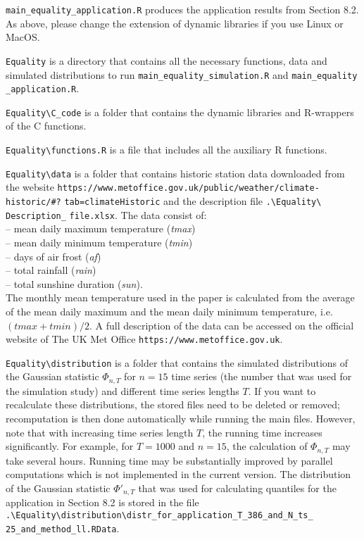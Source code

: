 \documentclass[a4paper,12pt]{article}
\begin{document}
\verb|main_equality_application.R| \hspace{1pt} produces the application results from Section 8.2. As above, please change the extension of dynamic libraries if you use Linux or MacOS.

\verb|Equality| \hspace{1pt} is a directory that contains all the necessary functions, data and simulated distributions to run \verb|main_equality_simulation.R| and \verb|main_equality| \linebreak \verb|_application.R|.

\verb|Equality\C_code| \hspace{1pt} is a folder that contains the dynamic libraries and R-wrappers of the C functions.

\verb|Equality\functions.R| \hspace{1pt} is a file that includes all the auxiliary R functions.

\verb|Equality\data| \hspace{1pt} is a folder that contains historic station data downloaded from the website
{\verb|https://www.metoffice.gov.uk/public/weather/climate-historic/#?| \linebreak \verb|tab=climateHistoric|
and the description file \verb|.\Equality\| \verb|Description_| \verb|file.xlsx|. The data consist of: \\[0.2cm]
-- mean daily maximum temperature (\textit{tmax}) \\
-- mean daily minimum temperature (\textit{tmin}) \\
-- days of air frost (\textit{af}) \\
-- total rainfall (\textit{rain}) \\
-- total sunshine duration (\textit{sun}). \\[0.2cm]
The monthly mean temperature used in the paper is calculated from the average of the mean daily maximum and the mean daily minimum temperature, i.e.\ $(tmax+tmin)/2$. A full description of the data can be accessed on the official website of The UK Met Office \verb|https://www.metoffice.gov.uk|.}

\verb|Equality\distribution| \hspace{1pt} is a folder that contains the simulated distributions of the Gaussian statistic $\Phi_{n, T}$ for $n= 15$ time series (the number that was used for the simulation study) and different time series lengths $T$. If you want to recalculate these distributions, the stored files need to be deleted or removed; recomputation is then done automatically while running the main files. However, note that with increasing time series length $T$, the running time increases significantly. For example, for $T = 1000$ and $n = 15$, the calculation of $\Phi_{n, T}$ may take several hours. Running time may be substantially improved by parallel computations which is not implemented in the current version. The distribution of the Gaussian statistic $\Phi'_{n, T}$ that was used for calculating quantiles for the application in Section 8.2 is stored in the file
\verb|.\Equality\distribution\distr_for_application_T_386_and_N_ts_| \linebreak \verb|25_and_method_ll.RData|.
\end{document}
